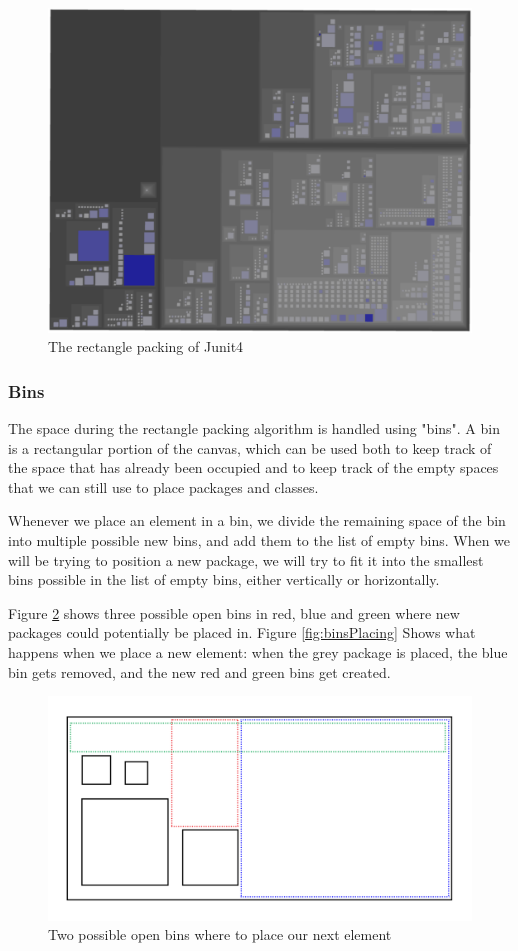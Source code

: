 \documentclass[]{usiinfbachelorproject}
\begin{document}
\begin{figure} [H]
\centering
\includegraphics[width=.7\textwidth]{pictures/junit4Above.png}
\caption{The rectangle packing of Junit4}
\label{fig:rectanglePacking}
\end{figure}

\subsubsection{Bins} \label{Bins}
The space during the rectangle packing algorithm is handled using "bins". A bin is a rectangular portion of the canvas, which can be used both to keep track of the space that has already been occupied and to keep track of the empty spaces that we can still use to place packages and classes.

Whenever we place an element in a bin, we divide the remaining space of the bin into multiple possible new bins, and add them to the list of empty bins. When we will be trying to position a new package, we will try to fit it into the smallest bins possible in the list of empty bins, either vertically or horizontally.

Figure \ref{fig:bins} shows three possible open bins in red, blue and green where new packages could potentially be placed in. Figure \ref{fig:binsPlacing} Shows what happens when we place a new element: when the grey package is placed, the blue bin gets removed, and the new red and green bins get created.

\begin{figure} [H]
\centering
\includegraphics[width=.7\textwidth]{pictures/bins.png}
\caption{Two possible open bins where to place our next element}
\label{fig:bins}
\end{figure}
\end{document}
